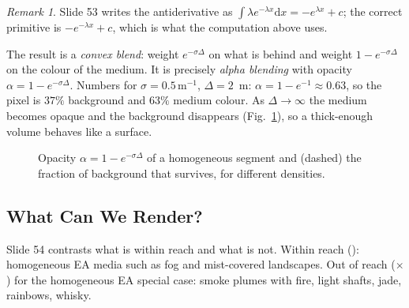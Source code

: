 \documentclass[11pt,a4paper]{article}
\theoremstyle{definition}
\theoremstyle{plain}
\theoremstyle{remark}
\newtheorem{remark}[definition]{Remark}
\begin{document}
\begin{remark}
Slide 53 writes the antiderivative as $\int\lambda e^{-\lambda x}\mathrm dx=-e^{\lambda x}+c$; the correct primitive is $-e^{-\lambda x}+c$, which is what the computation above uses.
\end{remark}

\begin{intuition}
The result is a \emph{convex blend}: weight $e^{-\sigma\Delta}$ on what is behind and weight $1-e^{-\sigma\Delta}$ on the colour of the medium. It is precisely \emph{alpha blending} with opacity $\alpha=1-e^{-\sigma\Delta}$. Numbers for $\sigma=0.5\,\mathrm m^{-1}$, $\Delta=2$~m: $\alpha=1-e^{-1}\approx0.63$, so the pixel is $37\%$ background and $63\%$ medium colour. As $\Delta\to\infty$ the medium becomes opaque and the background disappears (Fig.~\ref{fig:alpha}), so a thick-enough volume behaves like a surface.
\end{intuition}

\begin{figure}[h]
\centering
{}
\caption{Opacity $\alpha=1-e^{-\sigma\Delta}$ of a homogeneous segment and (dashed) the fraction of background that survives, for different densities.}\label{fig:alpha}
\end{figure}

\subsection{What Can We Render?}

Slide 54 contrasts what is within reach and what is not. Within reach (\checkmark): homogeneous EA media such as fog and mist-covered landscapes. Out of reach ($\times$) for the homogeneous EA special case: smoke plumes with fire, light shafts, jade, rainbows, whisky.
\end{document}
